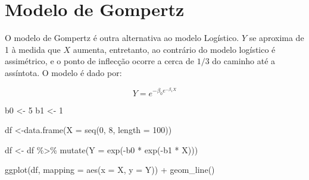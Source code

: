 \documentclass[
]{book}
\newenvironment{Shaded}{\begin{snugshade}}{\end{snugshade}}
\newcommand{\AttributeTok}[1]{\textcolor[rgb]{0.77,0.63,0.00}{#1}}
\newcommand{\DecValTok}[1]{\textcolor[rgb]{0.00,0.00,0.81}{#1}}
\newcommand{\FunctionTok}[1]{\textcolor[rgb]{0.00,0.00,0.00}{#1}}
\newcommand{\NormalTok}[1]{#1}
\newcommand{\OtherTok}[1]{\textcolor[rgb]{0.56,0.35,0.01}{#1}}
\newcommand{\SpecialCharTok}[1]{\textcolor[rgb]{0.00,0.00,0.00}{#1}}
\begin{document}
\hypertarget{modelo-de-gompertz}{%
\section{Modelo de Gompertz}\label{modelo-de-gompertz}}

O modelo de Gompertz é outra alternativa ao modelo Logístico. \(Y\) se aproxima de 1 à medida que \(X\) aumenta, entretanto, ao contrário do modelo logístico é assimétrico, e o ponto de inflecção ocorre a cerca de \(1/3\) do caminho até a assíntota. O modelo é dado por:

\[Y = e^{-\beta_0 e^{-\beta_1 X}}\]

\begin{Shaded}
\begin{Highlighting}[]
\NormalTok{b0 }\OtherTok{\textless{}{-}} \DecValTok{5}
\NormalTok{b1 }\OtherTok{\textless{}{-}} \DecValTok{1}

\NormalTok{df }\OtherTok{\textless{}{-}}\FunctionTok{data.frame}\NormalTok{(}\AttributeTok{X =} \FunctionTok{seq}\NormalTok{(}\DecValTok{0}\NormalTok{, }\DecValTok{8}\NormalTok{, }\AttributeTok{length =} \DecValTok{100}\NormalTok{))}

\NormalTok{df }\OtherTok{\textless{}{-}}\NormalTok{ df }\SpecialCharTok{\%\textgreater{}\%} \FunctionTok{mutate}\NormalTok{(}\AttributeTok{Y =} \FunctionTok{exp}\NormalTok{(}\SpecialCharTok{{-}}\NormalTok{b0 }\SpecialCharTok{*} \FunctionTok{exp}\NormalTok{(}\SpecialCharTok{{-}}\NormalTok{b1 }\SpecialCharTok{*}\NormalTok{ X)))}

\FunctionTok{ggplot}\NormalTok{(df, }\AttributeTok{mapping =} \FunctionTok{aes}\NormalTok{(}\AttributeTok{x =}\NormalTok{ X, }\AttributeTok{y =}\NormalTok{ Y)) }\SpecialCharTok{+}
  \FunctionTok{geom\_line}\NormalTok{()}
\end{Highlighting}
\end{Shaded}
\end{document}
